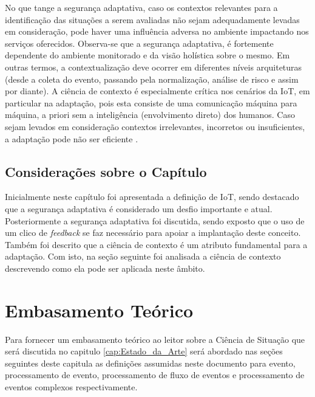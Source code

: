 \documentclass[tid,table]{texufpel} %
\begin{document}
No que tange a segurança adaptativa, caso os contextos relevantes para a identificação das situações a serem avaliadas não sejam adequadamente levadas em consideração, pode haver uma influência adversa no ambiente impactando nos serviços oferecidos. Observa-se que a segurança adaptativa, é fortemente dependente do ambiente monitorado e da visão holística sobre o mesmo. Em outras termos, a contextualização deve ocorrer em diferentes níveis arquiteturas (desde a coleta do evento, passando pela normalização, análise de risco e assim por diante). A ciência de contexto é especialmente crítica nos cenários da IoT, em particular na adaptação, pois esta consiste de uma comunicação máquina para máquina, a priori sem a inteligência (envolvimento direto) dos humanos. Caso sejam levados em consideração contextos irrelevantes, incorretos ou insuficientes, a adaptação pode não ser eficiente \cite{aman15}.



\section{Considerações sobre o Capítulo}

Inicialmente neste capítulo foi apresentada a definição de IoT, sendo destacado que a segurança adaptativa é considerado um desfio importante e atual. Posteriormente a segurança adaptativa foi discutida, sendo exposto que o uso de um clico de \textit{feedback} se faz necessário para apoiar a implantação deste conceito. Também foi descrito que a ciência de contexto é um atributo fundamental para a adaptação. Com isto, na seção seguinte foi analisada a ciência de contexto descrevendo como ela pode ser aplicada neste âmbito.


\chapter{Embasamento Teórico}
Para fornecer um embasamento teórico ao leitor sobre a Ciência de Situação que será discutida no capitulo \ref{cap:Estado_da_Arte} será abordado nas seções seguintes deste capitula as definições assumidas neste documento para evento, processamento de evento, processamento de fluxo de eventos e processamento de eventos complexos respectivamente.
\end{document}
